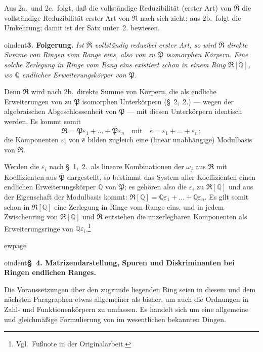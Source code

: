 \documentclass[12pt,a4paper]{article}
\newcommand{\mf}[1]{\mathfrak{#1}}     %
\newcommand{\PP}{\mathfrak{P}}          %
\newcommand{\QQ}{\mathbb{Q}}            %
\theoremstyle{definition}
\begin{document}
Aus 2a.\ und 2c.\ folgt, da\ss{} die vollst\"andige Reduzibilit\"at (erster Art)
von $\overline{\mf{R}}$ die vollst\"andige Reduzibilit\"at erster Art von $\mf{R}$
nach sich zieht; aus 2b.\ folgt die Umkehrung; damit ist der Satz unter~2.
bewiesen.

\medskip



oindent\textbf{3. Folgerung.} \textit{Ist $\overline{\mf{R}}$ vollst\"andig reduzibel erster
Art, so wird $\overline{\mf{R}}$ direkte Summe von Ringen vom Range eins, also
von zu $\overline{\PP}$ isomorphen K\"orpern. Eine solche Zerlegung in Ringe
vom Rang eins existiert schon in einem Ring $\mf{R}[\QQ]$, wo $\QQ$ endlicher
Erweiterungsk\"orper von $\PP$.}

Denn $\overline{\mf{R}}$ wird nach 2b.\ direkte Summe von K\"orpern, die als
endliche Erweiterungen von zu $\overline{\PP}$ isomorphen Unterk\"orpern
(\S~2,~2.) --- wegen der algebraischen Abgeschlossenheit von
$\overline{\PP}$ --- mit diesen Unterk\"orpern identisch werden. Es kommt somit
\[
\overline{\mf{R}} = \overline{\PP}\varepsilon_1 + \dots + \overline{\PP}\varepsilon_n
\quad\text{mit}\quad
\bar{e} = \varepsilon_1 + \dots + \varepsilon_n;
\]
die Komponenten $\varepsilon_i$ von $\bar{e}$ bilden zugleich eine (linear
unabh\"angige) Modulbasis von $\overline{\mf{R}}$.

Werden die $\varepsilon_i$ nach \S~1,~2.\ als lineare Kombinationen der
$\omega_j$ aus $\mf{R}$ mit Koeffizienten aus $\overline{\PP}$ dargestellt, so
bestimmt das System aller Koeffizienten einen endlichen Erweiterungsk\"orper
$\QQ$ von $\PP$; es geh\"oren also die $\varepsilon_i$ zu $\mf{R}[\QQ]$ und aus der
Eigenschaft der Modulbasis kommt: $\mf{R}[\QQ] = \QQ\varepsilon_1 + \dots +
\QQ\varepsilon_n$. Es gilt somit schon in $\mf{R}[\QQ]$ eine Zerlegung in
Ringe vom Range eins, und in jedem Zwischenring von $\mf{R}[\QQ]$ und
$\overline{\mf{R}}$ entstehen die unzerlegbaren Komponenten als
Erweiterungsringe von $\QQ\varepsilon_i$.\footnote{Vgl.\ Fu\ss note in der Originalarbeit.}



ewpage
\setcounter{page}{553}



oindent\textbf{\S~4. Matrizendarstellung, Spuren und Diskriminanten bei Ringen
endlichen Ranges.}

Die Voraussetzungen \"uber den zugrunde liegenden Ring seien in diesem
und dem n\"achsten Paragraphen etwas allgemeiner als bisher, um auch die
Ordnungen in Zahl- und Funktionenk\"orpern zu umfassen. Es handelt sich um
eine allgemeine und gleichm\"a\ss ige Formulierung von im wesentlichen
bekannten Dingen.
\end{document}
